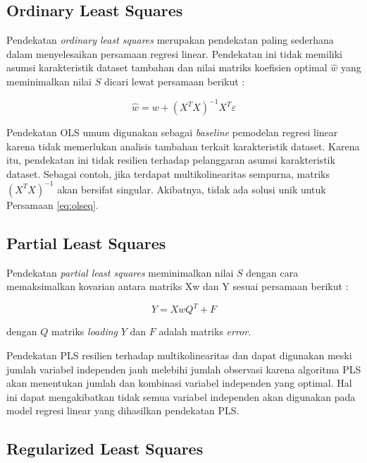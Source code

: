 \subsection{Ordinary Least Squares}

Pendekatan \textit{ordinary least squares} merupakan pendekatan paling
sederhana dalam menyelesaikan persamaan regresi linear. Pendekatan ini tidak
memiliki asumsi karakteristik dataset tambahan dan nilai matriks koefisien
optimal $\hat{w}$ yang meminimalkan nilai $S$ dicari lewat persamaan berikut
\cite{rao1997}:

\begin{equation}
\label{eq:olseq}
	\hat{w} = w + \left( X^T X \right)^{-1} X^T\varepsilon
\end{equation}

Pendekatan OLS umum digunakan sebagai \textit{baseline} pemodelan regresi
linear karena tidak memerlukan analisis tambahan terkait karakteristik dataset.
Karena itu, pendekatan ini tidak resilien terhadap pelanggaran asumsi
karakteristik dataset. Sebagai contoh, jika terdapat multikolinearitas
sempurna, matriks $\left( X^T X \right)^{-1}$ akan bersifat singular. Akibatnya,
tidak ada solusi unik untuk Persamaan \ref{eq:olseq}.

\subsection{Partial Least Squares}

Pendekatan \textit{partial least squares} meminimalkan nilai $S$ dengan cara
memaksimalkan kovarian antara matriks Xw dan Y sesuai persamaan berikut
\cite{xu2016}:

\begin{equation}
\label{eq:plseq}
	Y = XwQ^T + F
\end{equation}

dengan $Q$ matriks \textit{loading} $Y$ dan $F$ adalah matriks \textit{error}.

Pendekatan PLS resilien terhadap multikolinearitas dan dapat digunakan meski
jumlah variabel independen jauh melebihi jumlah observasi karena algoritma PLS
akan menentukan jumlah dan kombinasi variabel independen yang optimal. Hal ini
dapat mengakibatkan tidak semua variabel independen akan digunakan pada model
regresi linear yang dihasilkan pendekatan PLS.

\subsection{Regularized Least Squares}

